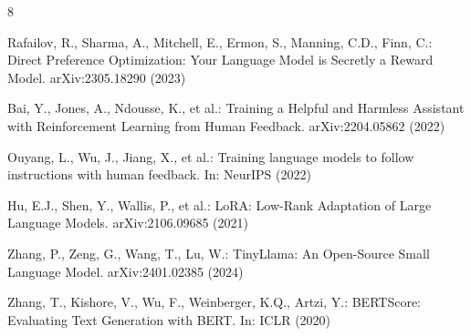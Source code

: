 \documentclass{llncs}
\begin{document}
\begin{thebibliography}{8}

Rafailov, R., Sharma, A., Mitchell, E., Ermon, S., Manning, C.D., Finn, C.:
Direct Preference Optimization: Your Language Model is Secretly a Reward Model.
arXiv:2305.18290 (2023)

Bai, Y., Jones, A., Ndousse, K., et al.:
Training a Helpful and Harmless Assistant with Reinforcement Learning from Human Feedback.
arXiv:2204.05862 (2022)

Ouyang, L., Wu, J., Jiang, X., et al.:
Training language models to follow instructions with human feedback.
In: NeurIPS (2022)

Hu, E.J., Shen, Y., Wallis, P., et al.:
LoRA: Low-Rank Adaptation of Large Language Models.
arXiv:2106.09685 (2021)

Zhang, P., Zeng, G., Wang, T., Lu, W.:
TinyLlama: An Open-Source Small Language Model.
arXiv:2401.02385 (2024)

Zhang, T., Kishore, V., Wu, F., Weinberger, K.Q., Artzi, Y.:
BERTScore: Evaluating Text Generation with BERT.
In: ICLR (2020)

\end{thebibliography}
\end{document}
